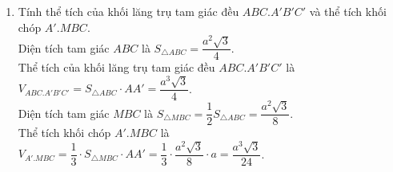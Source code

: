 \begin{bt}
{\begin{enumerate}
			Ta có $\heva{&AA'\perp (ABC)\\&CM\subset (ABC)}\Rightarrow AA'\perp CM$.\\
			Khi đó $\heva{&CM\perp AB\\&CM\perp AA'}\Rightarrow CM\perp (ABB'A')$.\\
			Ta có $\heva{&CC'\parallel (ABB'A')\\&A'M\subset (ABB'A')}$\\
			$\Rightarrow \mathrm{d}(CC',A'M)=\mathrm{d}(CC',(ABB'A'))=\mathrm{d}(C,(ABB'A'))=CM=\dfrac{a\sqrt{3}}{2}$.
			\item Tính thể tích của khối lăng trụ tam giác đều $ABC.A'B'C'$ và thể tích khối chóp $A'.MBC$.\\
			Diện tích tam giác $ABC$ là $S_{\triangle {ABC}}=\dfrac{a^2\sqrt{3}}{4}$.\\
			Thể tích của khối lăng trụ tam giác đều $ABC.A'B'C'$ là $V_{ABC.A'B'C'}=S_{\triangle {ABC}}\cdot AA'=\dfrac{a^3\sqrt{3}}{4}$.\\
			Diện tích tam giác $MBC$ là $S_{\triangle {MBC}}=\dfrac{1}{2}S_{\triangle{ABC}}=\dfrac{a^2\sqrt{3}}{8}$.\\
			Thể tích khối chóp $A'.MBC$ là $V_{A'.MBC}=\dfrac{1}{3}\cdot S_{\triangle{MBC}}\cdot AA'=\dfrac{1}{3}\cdot \dfrac{a^2\sqrt{3}}{8}\cdot a=\dfrac{a^3\sqrt{3}}{24}$.
		\end{enumerate}
	}
\end{bt}

